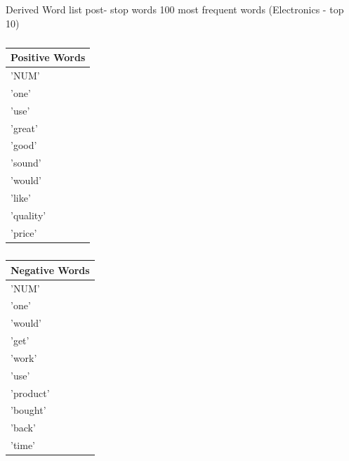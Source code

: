 \documentclass{llncs}
\begin{document}
\begin{center}
    \begin{table}
    \caption{Derived Word list post- stop words 100 most frequent words (Electronics - top 10)}
    \begin{minipage}{.5\linewidth}
    \caption{}
    \centering
    \begin{tabular}{| l |}
        \hline
        Positive Words \\ \hline
        'NUM' \\ \hline
        'one' \\ \hline
        'use' \\ \hline
        'great' \\ \hline
        'good' \\ \hline
        'sound' \\ \hline
        'would' \\ \hline
        'like' \\ \hline
        'quality' \\ \hline
        'price' \\ \hline
    \end{tabular}
    \end{minipage}%
    \begin{minipage}{.5\linewidth}
    \centering
    \caption{}
    \begin{tabular}{| l |}
        \hline
        Negative Words \\ \hline
        'NUM' \\ \hline
        'one' \\ \hline
        'would' \\ \hline
        'get' \\ \hline
        'work' \\ \hline
        'use' \\ \hline
        'product' \\ \hline
        'bought' \\ \hline
        'back' \\ \hline
        'time' \\ \hline
    \end{tabular}
    \end{minipage} 
    \end{table}
\end{center}
\end{document}
